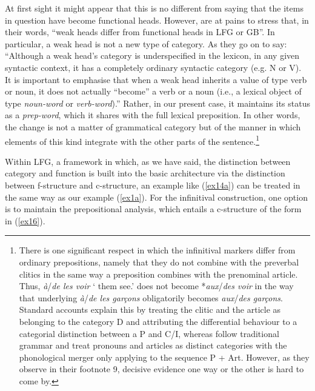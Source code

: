 \documentclass[output=paper]{langsci/langscibook}
\begin{document}
\largerpage[-1]
At first sight it might appear that this is no different from saying that the
items in question have become functional heads. However, \cite[note
12]{Abeilleetal06} are at pains to stress that, in their words, \enquote{weak heads
differ from functional heads in \gls{LFG} or GB}. In particular, a weak head is not a new type of
category. As they go on to say: ``Although a weak head's category is
underspecified in the lexicon, in any given syntactic context, it has a
completely ordinary syntactic category (e.g. N or V).
It is important to emphasise that when a weak head inherits a value of type
verb or noun, it does not actually ``become'' a verb or a noun (i.e., a lexical
object of type \emph{noun-word} or \emph{verb-word}).'' Rather, in our present
case, it maintains its status as a \emph{prep-word}, which it shares with the
full lexical preposition. In other words, the change is not a matter of
grammatical category but of the manner in which elements of this kind integrate
with the other parts of the sentence.\footnote{There is one significant respect
    in which the infinitival markers differ from ordinary prepositions, namely
    that they do not combine with the preverbal clitics in the same
    way a preposition combines with the prenominal article. Thus,
    \emph{\`a}/\emph{de les voir} `\Comp{} them see.\Inf{}' does not become
    *\emph{aux}/\emph{des voir} in the way that underlying \emph{\`a}/\emph{de
    les gar\c{c}ons} obligatorily becomes \emph{aux}/\emph{des gar\c{c}ons}.
    Standard accounts explain this by treating the clitic and the article as
    belonging to the category D and attributing the differential behaviour to a
    categorial distinction between a P and C/I, whereas
    \citeauthor{Abeilleetal06}  follow traditional grammar and treat pronouns
    and articles as distinct categories with the phonological merger only
applying to the sequence P + Art. However, as they observe in their footnote 9,
decisive evidence one way or the other is hard to come by.}

Within \gls{LFG}, a framework in which, as we have said, the distinction
between category and function is built into the basic architecture via the
distinction be\-tween f-structure and c-structure, an example like (\ref{ex14a})
can be treated in the same way as our  example (\ref{ex1a}). For the
infinitival construction, one option is to maintain the prepositional analysis,
which entails a c-structure of the form in (\ref{ex16}).
\end{document}
